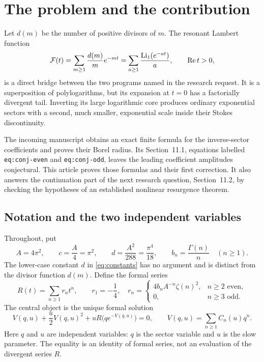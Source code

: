\section{The problem and the contribution}\label{sec:setting}

Let $d(m)$ be the number of positive divisors of $m$. The resonant Lambert
function
\begin{equation}\label{eq:F}
 \mathcal F(t)=\sum_{m\ge1}\frac{d(m)}m e^{-mt}
       =\sum_{a\ge1}\frac{\operatorname{Li}_1(e^{-at})}{a},\qquad \operatorname{Re} t>0,
\end{equation}
is a direct bridge between the two programs named in the research request.
It is a superposition of polylogarithms, but its expansion at $t=0$ has a
factorially divergent tail. Inverting its large logarithmic core produces
ordinary exponential sectors with a second, much smaller, exponential scale
inside their Stokes discontinuity.

The incoming manuscript \cite{incoming} obtains an exact finite formula for
the inverse-sector coefficients and proves their Borel radius. Its
Section~11.1, equations labelled \texttt{eq:conj-even} and
\texttt{eq:conj-odd}, leaves the leading coefficient amplitudes conjectural.
This article proves those formulas and their first correction. It also
answers the continuation part of the next research question, Section~11.2,
by checking the hypotheses of an established nonlinear resurgence theorem.

\subsection{Notation and the two independent variables}

Throughout, put
\begin{equation}\label{eq:constants}
 A=4\pi^2,\qquad c=\frac A4=\pi^2,\qquad
 d=\frac{A^2}{288}=\frac{\pi^4}{18},\qquad
 b_n=\frac{\Gamma(n)}n\quad(n\ge1).
\end{equation}
The lower-case constant $d$ in \eqref{eq:constants} has no argument and is
distinct from the divisor function $d(m)$. Define the formal series
\begin{equation}\label{eq:R}
 R(t)=\sum_{n\ge1}r_nt^n,\qquad
 r_1=-\frac14,\quad
 r_n=\begin{cases}
 4b_nA^{-n}\zeta(n)^2,&n\ge2\text{ even},\\
 0,&n\ge3\text{ odd}.
 \end{cases}
\end{equation}
The central object is the unique formal solution
\begin{equation}\label{eq:implicit}
 V(q,u)+\frac u2 V(q,u)^2+uR\bigl(qe^{-V(q,u)}\bigr)=0,
 \qquad V(q,u)=\sum_{n\ge1}C_n(u)q^n.
\end{equation}
Here $q$ and $u$ are independent variables: $q$ is the sector variable and
$u$ is the slow parameter. The equality is an identity of formal series,
not an evaluation of the divergent series $R$.

